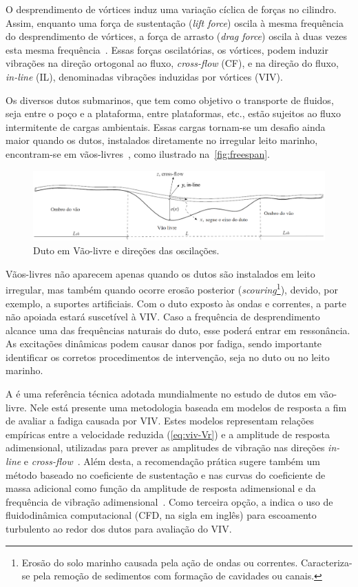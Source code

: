 O desprendimento de vórtices induz uma variação cíclica de forças no cilindro.
Assim, enquanto uma força de sustentação (\textit{lift force}) oscila à mesma frequência do desprendimento de vórtices, a força de arrasto (\textit{drag force}) oscila à duas vezes esta mesma frequência~\cite{Sumer1995}.
Essas forças oscilatórias, os vórtices, podem induzir vibrações na direção ortogonal ao fluxo, \textit{cross-flow} (CF), e na direção do fluxo, \textit{in-line} (IL), denominadas vibrações induzidas por vórtices (VIV).

Os diversos dutos submarinos, que tem como objetivo o transporte de fluidos, seja entre o poço e a plataforma, entre plataformas, etc., estão sujeitos ao fluxo intermitente de cargas ambientais.
Essas cargas tornam-se um desafio ainda maior quando os dutos, instalados diretamente no irregular leito marinho, encontram-se em vãos-livres~\cite{Fyrileiv1998}, como ilustrado na~\autoref{fig:freespan}.

\begin{figure}[!ht]
	\centering
    \caption{Duto em Vão-livre e direções das oscilações.}\label{fig:freespan}
	\includegraphics[width=1\textwidth]{imagens/freespan}
\end{figure}

Vãos-livres não aparecem apenas quando os dutos são instalados em leito irregular, mas também quando ocorre erosão posterior (\textit{scouring}\footnote{Erosão do solo marinho causada pela ação de ondas ou correntes. Caracteriza-se pela remoção de sedimentos com formação de cavidades ou canais.}), devido, por exemplo, a suportes artificiais.
Com o duto exposto às ondas e correntes, a parte não apoiada estará suscetível à VIV.\@
Caso a frequência de desprendimento alcance uma das frequências naturais do duto, esse poderá entrar em ressonância.
As excitações dinâmicas podem causar danos por fadiga, sendo importante identificar os corretos procedimentos de intervenção, seja no duto ou no leito marinho.

A  é uma referência técnica adotada mundialmente no estudo de dutos em vão-livre.
Nele está presente uma metodologia baseada em modelos de resposta a fim de avaliar a fadiga causada por VIV\@.
Estes modelos representam relações empíricas entre a velocidade reduzida (\autoref{eq:viv-Vr}) e a amplitude de resposta adimensional, utilizadas para prever as amplitudes de vibração nas direções \textit{in-line} e \textit{cross-flow}~\cite{Mork2003,DNV2017}.
Além desta, a recomendação prática sugere também um método baseado no coeficiente de sustentação e nas curvas do coeficiente de massa adicional como função da amplitude de resposta adimensional e da frequência de vibração adimensional~\cite{DNV2017}.
Como terceira opção, a  indica o uso de fluidodinâmica computacional (CFD, na sigla em inglês) para escoamento turbulento ao redor dos dutos para avaliação do VIV\@.

